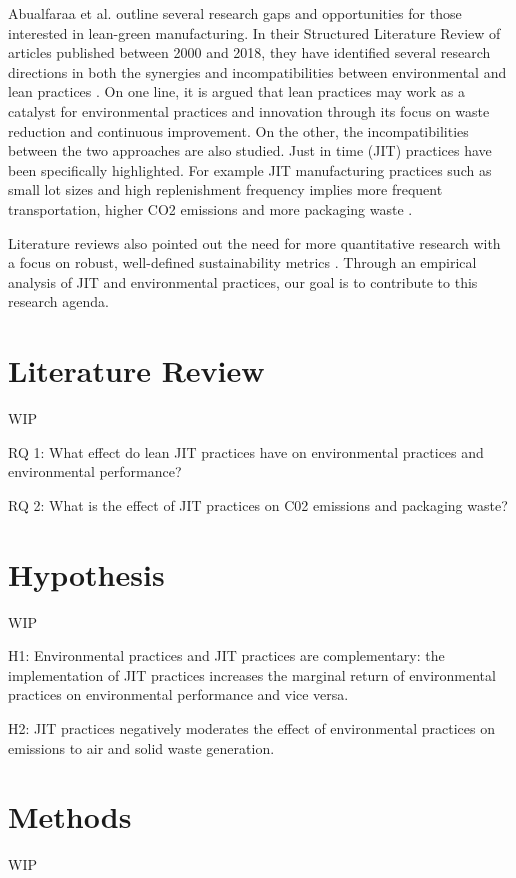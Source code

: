\documentclass[]{article}
\begin{document}
Abualfaraa et al. outline several research gaps and opportunities for those interested in lean-green manufacturing. 
In their Structured Literature Review of articles published between 2000 and 2018, they have identified several research directions in both the synergies and incompatibilities between environmental and lean practices \citep{abualfaraaLeanGreenManufacturingPractices2020}. 
On one line, it is argued that lean practices may work as a catalyst for environmental practices and innovation through its focus on waste reduction and continuous improvement.
On the other, the incompatibilities between the two approaches are also studied. 
Just in time (JIT) practices have been specifically highlighted. 
For example JIT manufacturing practices such as small lot sizes and high replenishment frequency implies more frequent transportation, higher CO2 emissions and more packaging waste \citep{diesteRelationshipLeanEnvironmental2019}.

Literature reviews also pointed out the need for more quantitative research with a focus on robust, well-defined sustainability metrics \citep{abualfaraaLeanGreenManufacturingPractices2020}. 
Through an empirical analysis of JIT and environmental practices, our goal is to contribute to this research agenda.
    
\section{Literature Review}
WIP

RQ 1: What effect do lean JIT practices have on environmental practices and environmental performance?

RQ 2: What is the effect of JIT practices on C02 emissions and packaging waste?

\section{Hypothesis}
WIP

H1: Environmental practices and JIT practices are complementary: the implementation of JIT practices increases the marginal return of environmental practices on environmental performance and vice versa.

H2: JIT practices negatively moderates the effect of environmental practices on emissions to air and solid waste generation.

\section{Methods}
WIP 
\end{document}
